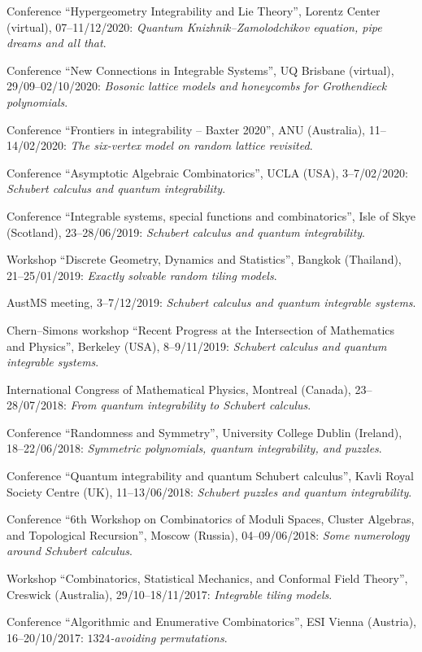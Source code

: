 \s Conference ``Hypergeometry Integrability and Lie Theory'', Lorentz Center (virtual), 07--11/12/2020: {\sl Quantum Knizhnik--Zamolodchikov equation, pipe dreams and all that}.

\s Conference ``New Connections in Integrable Systems'', UQ Brisbane (virtual), 29/09--02/10/2020: {\sl Bosonic lattice models and honeycombs for Grothendieck polynomials}.

\s Conference ``Frontiers in integrability -- Baxter 2020'', ANU (Australia), 11--14/02/2020: {\sl The six-vertex model on random lattice revisited}.

\s Conference ``Asymptotic Algebraic Combinatorics'', UCLA (USA), 3--7/02/2020: {\sl Schubert calculus and quantum integrability}.

\s Conference ``Integrable systems, special functions and combinatorics'', Isle of Skye (Scotland), 23--28/06/2019: {\sl Schubert calculus and quantum integrability}.

\s Workshop ``Discrete Geometry, Dynamics and Statistics'', Bangkok (Thailand), 21--25/01/2019: {\sl Exactly solvable random tiling models}.

\s AustMS meeting, 3--7/12/2019: {\sl Schubert calculus and quantum integrable systems}.

\s Chern--Simons workshop ``Recent Progress at the Intersection of Mathematics and Physics'', Berkeley (USA), 8--9/11/2019: {\sl Schubert calculus and quantum integrable systems}.

\s International Congress of Mathematical Physics, Montreal (Canada), 23--28/07/2018: {\sl From quantum integrability to Schubert calculus}.

\s Conference ``Randomness and Symmetry'', University College Dublin (Ireland), 18--22/06/2018: {\sl Symmetric polynomials, quantum integrability, and puzzles}.

\s Conference ``Quantum integrability and quantum Schubert calculus'', Kavli Royal Society Centre (UK), 11--13/06/2018: {\sl Schubert puzzles and quantum integrability}.

\s Conference ``6th Workshop on Combinatorics of Moduli Spaces, Cluster Algebras, and Topological Recursion'', Moscow (Russia), 04--09/06/2018: {\sl Some numerology around Schubert calculus}.

\s Workshop ``Combinatorics, Statistical Mechanics, and Conformal Field Theory'', Creswick (Australia), 29/10--18/11/2017: {\sl Integrable tiling models}.

\s Conference ``Algorithmic and Enumerative Combinatorics'', ESI Vienna (Austria), 16--20/10/2017: {\sl $1324$-avoiding permutations}.

